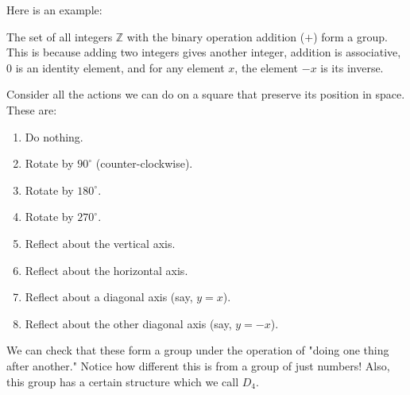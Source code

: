 \documentclass{scrartcl}
\begin{document}
Here is an example:
\begin{example}
    The set of all integers $\mathbb{Z}$ with the binary operation addition ($+$) form a group.
    This is because adding two integers gives another integer,
    addition is associative,
    $0$ is an identity element,
    and for any element $x$, the element $-x$ is its inverse.
\end{example}
\begin{example}
    Consider all the actions we can do on a square that preserve its position in space.
    These are:
    \begin{enumerate}
        \item Do nothing.
        \item Rotate by $90^\circ$ (counter-clockwise).
        \item Rotate by $180^\circ$.
        \item Rotate by $270^\circ$.
        \item Reflect about the vertical axis.
        \item Reflect about the horizontal axis.
        \item Reflect about a diagonal axis (say, $y=x$).
        \item Reflect about the other diagonal axis (say, $y=-x$).
    \end{enumerate}
    We can check that these form a group under the operation of "doing one thing after another."
    Notice how different this is from a group of just numbers!
    Also, this group has a certain structure which we call $D_4$.
\end{example}
\end{document}
